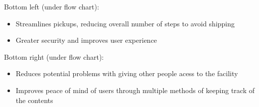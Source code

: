 \documentclass{article}
\begin{document}
Bottom left (under flow chart):

\begin{itemize}

\item Streamlines pickups, reducing overall number of steps to avoid shipping
\item Greater security and improves user experience

\end{itemize}

Bottom right (under flow chart):

\begin{itemize}

\item Reduces potential problems with giving other people acess to the facility
\item Improves peace of mind of users through multiple methods of keeping track of the contents

\end{itemize}
\end{document}
